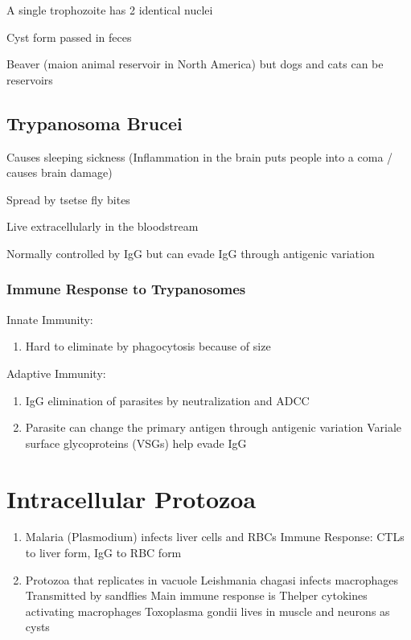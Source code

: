 \documentclass{notes}
\begin{document}
\tab \indicates A single trophozoite has 2 identical nuclei

Cyst form passed in feces

Beaver (maion animal reservoir in North America) but dogs and cats can be reservoirs

\subsection*{Trypanosoma Brucei}
Causes sleeping sickness (Inflammation in the brain puts people into a coma / causes brain damage)

Spread by tsetse fly bites

Live extracellularly in the bloodstream

Normally controlled by IgG but can evade IgG through antigenic variation

\subsubsection*{Immune Response to Trypanosomes}
Innate Immunity:
\begin{enumerate}
    \item Hard to eliminate by phagocytosis because of size
\end{enumerate}

Adaptive Immunity:
\begin{enumerate}
    \item IgG elimination of parasites by neutralization and ADCC
    \item Parasite can change the primary antigen through antigenic variation
    \subitem Variale surface glycoproteins (VSGs) help evade IgG
\end{enumerate}

\section*{Intracellular Protozoa}
\begin{enumerate}
    \item Malaria (Plasmodium) infects liver cells and RBCs
    \subitem Immune Response: CTLs to liver form, IgG to RBC form
    \item Protozoa that replicates in vacuole
    \subitem Leishmania chagasi infects macrophages
    \subsubitem Transmitted by sandflies
    \subsubitem Main immune response is Thelper cytokines activating macrophages
    \subitem Toxoplasma gondii lives in muscle and neurons as cysts
\end{enumerate}
\end{document}
